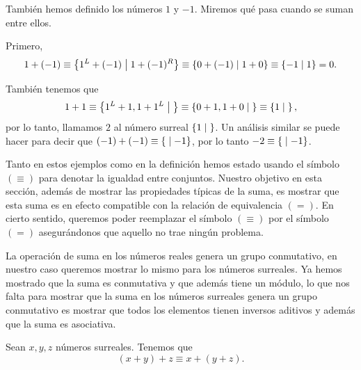     \begin{example}
        Tambi\'en hemos definido los n\'umeros $1$ y $-1$. Miremos qu\'e pasa cuando se suman entre ellos.

        Primero,
        \[
            1 + (-1) \equiv \left\{1^L + (-1)\;\middle|\; 1+(-1)^R\right\} \equiv \left\{0+(-1)\;\middle|\; 1+0\right\} \equiv \left\{-1\;\middle|\; 1\right\} = 0.
        \]

        Tambi\'en tenemos que
        \[
            1 + 1 \equiv \left\{1^L+1, 1+1^L\;\middle|\; \right\} \equiv \left\{0+1,1+0\;\middle|\; \right\} \equiv \left\{1\;\middle|\; \right\},
        \]
        por lo tanto, llamamos $2$ al n\'umero surreal $\left\{1\;\middle|\; \right\}$. Un an\'alisis similar se puede hacer para decir que $(-1)+(-1) \equiv \left\{\;\middle|\; -1\right\}$, por lo tanto $-2 \equiv \left\{\;\middle|\; -1\right\}$.
    \end{example}

    Tanto en estos ejemplos como en la definici\'on hemos estado usando el s\'imbolo $(\equiv)$ para denotar la igualdad entre conjuntos. Nuestro objetivo en esta secci\'on, adem\'as de mostrar las propiedades t\'ipicas de la suma, es mostrar que esta suma es en efecto compatible con la relaci\'on de equivalencia $(=)$. En cierto sentido, queremos poder reemplazar el s\'imbolo $(\equiv)$ por el s\'imbolo $(=)$ asegur\'andonos que aquello no trae ning\'un problema.

    La operaci\'on de suma en los n\'umeros reales genera un grupo conmutativo, en nuestro caso queremos mostrar lo mismo para los n\'umeros surreales. Ya hemos mostrado que la suma es conmutativa y que adem\'as tiene un m\'odulo, lo que nos falta para mostrar que la suma en los n\'umeros surreales genera un grupo conmutativo es mostrar que todos los elementos tienen inversos aditivos y adem\'as que la suma es asociativa.

    \begin{theorem}
        Sean $x, y, z$ n\'umeros surreales. Tenemos que
        \[
            (x+y)+z \equiv x+(y+z).
        \]
    \end{theorem}

